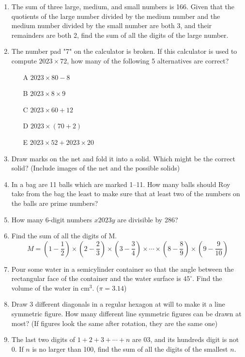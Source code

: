 \documentclass[12pt]{scrartcl}
\begin{document}
\begin{enumerate}
    \item The sum of three large, medium, and small numbers is 166. Given that the quotients of the large number divided by the medium number and the medium number divided by the small number are both 3, and their remainders are both 2, find the sum of all the digits of the large number.
    
    \item The number pad "7" on the calculator is broken. If this calculator is used to compute $2023 \times 72$, how many of the following 5 alternatives are correct?
    \begin{itemize}
        \item[A] $2023 \times 80 - 8$
        \item[B] $2023 \times 8 \times 9$
        \item[C] $2023 \times 60 + 12$
        \item[D] $2023 \times (70 + 2)$
        \item[E] $2023 \times 52 + 2023 \times 20$
    \end{itemize}
    
    \item Draw marks on the net and fold it into a solid. Which might be the correct solid? (Include images of the net and the possible solids)
    
    \item In a bag are 11 balls which are marked 1--11. How many balls should Roy take from the bag the least to make sure that at least two of the numbers on the balls are prime numbers?
    
    \item How many 6-digit numbers $x2023y$ are divisible by 286?
    
    \item Find the sum of all the digits of M.
    \[M = (1 - \frac{1}{2}) \times (2 - \frac{2}{3}) \times (3 - \frac{3}{4}) \times \cdots \times (8 - \frac{8}{9}) \times (9 - \frac{9}{10})\]
    
    \item Pour some water in a semicylinder container so that the angle between the rectangular face of the container and the water surface is $45^\circ$. Find the volume of the water in cm$^3$. ($\pi = 3.14$)
    
    \item Draw 3 different diagonals in a regular hexagon at will to make it a line symmetric figure. How many different line symmetric figures can be drawn at most? (If figures look the same after rotation, they are the same one)
    
    \item The last two digits of $1 + 2 + 3 + \cdots + n$ are 03, and its hundreds digit is not 0. If $n$ is no larger than 100, find the sum of all the digits of the smallest $n$.
\end{enumerate}
\end{document}
